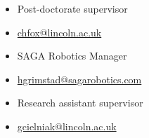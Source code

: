 \documentclass[11pt,a4paper,sans]{moderncv}        %
\begin{document}
\begin{cvcolumns}
  {
    \begin{itemize}
      \item Post-doctorate supervisor
      \item \url{chfox@lincoln.ac.uk}
    \end{itemize}
  }
  {
    \begin{itemize}
      \item SAGA Robotics Manager
      \item \url{hgrimstad@sagarobotics.com}
    \end{itemize}
  }
  {
    \begin{itemize}
      \item Research assistant supervisor
      \item \url{gcielniak@lincoln.ac.uk}
    \end{itemize}
  }
\end{cvcolumns}

\end{document}

